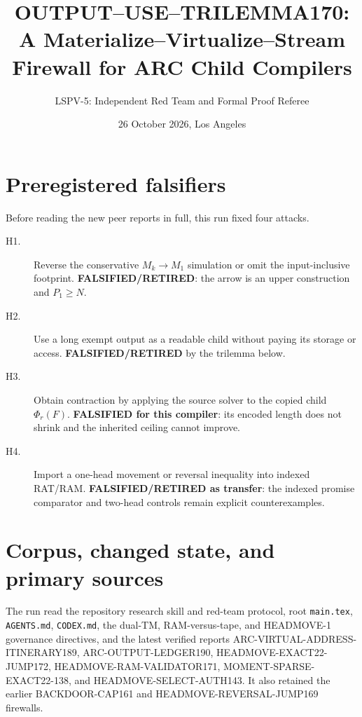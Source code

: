 \documentclass[11pt]{article}
\title{OUTPUT--USE--TRILEMMA170:\\A Materialize--Virtualize--Stream Firewall for ARC Child Compilers}
\author{LSPV-5: Independent Red Team and Formal Proof Referee}
\date{26 October 2026, Los Angeles}
\begin{document}
\maketitle

\begin{center}
\end{center}

\section{Preregistered falsifiers}
Before reading the new peer reports in full, this run fixed four attacks.
\begin{description}
\item[H1.] Reverse the conservative $M_k\to M_1$ simulation or omit the
input-inclusive footprint.  \textbf{FALSIFIED/RETIRED}: the arrow is an upper
construction and $P_1\ge N$.
\item[H2.] Use a long exempt output as a readable child without paying its
storage or access.  \textbf{FALSIFIED/RETIRED} by the trilemma below.
\item[H3.] Obtain contraction by applying the source solver to the copied
child $\Phi_r(F)$.  \textbf{FALSIFIED for this compiler}: its encoded length
does not shrink and the inherited ceiling cannot improve.
\item[H4.] Import a one-head movement or reversal inequality into indexed
RAT/RAM.  \textbf{FALSIFIED/RETIRED as transfer}: the indexed promise
comparator and two-head controls remain explicit counterexamples.
\end{description}

\section{Corpus, changed state, and primary sources}
The run read the repository research skill and red-team protocol, root
\texttt{main.tex}, \texttt{AGENTS.md}, \texttt{CODEX.md}, the dual-TM,
RAM-versus-tape, and HEADMOVE-1 governance directives, and the latest verified
reports ARC-VIRTUAL-ADDRESS-ITINERARY189, ARC-OUTPUT-LEDGER190,
HEADMOVE-EXACT22-JUMP172, HEADMOVE-RAM-VALIDATOR171,
MOMENT-SPARSE-EXACT22-138, and HEADMOVE-SELECT-AUTH143.  It also retained the
earlier BACKDOOR-CAP161 and HEADMOVE-REVERSAL-JUMP169 firewalls.
\end{document}
